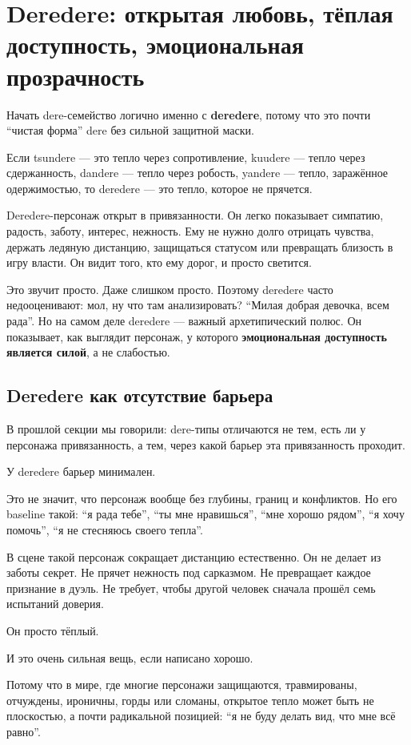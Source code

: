 \section{Deredere: открытая любовь, тёплая доступность, эмоциональная прозрачность}

Начать dere-семейство логично именно с \textbf{deredere}, потому что это
почти ``чистая форма'' dere без сильной защитной маски.

Если tsundere --- это тепло через сопротивление, kuudere --- тепло через
сдержанность, dandere --- тепло через робость, yandere --- тепло,
заражённое одержимостью, то deredere --- это тепло, которое не прячется.

Deredere-персонаж открыт в привязанности. Он легко показывает симпатию,
радость, заботу, интерес, нежность. Ему не нужно долго отрицать чувства,
держать ледяную дистанцию, защищаться статусом или превращать близость в
игру власти. Он видит того, кто ему дорог, и просто светится.

Это звучит просто. Даже слишком просто. Поэтому deredere часто
недооценивают: мол, ну что там анализировать? ``Милая добрая девочка,
всем рада''. Но на самом деле deredere --- важный архетипический полюс.
Он показывает, как выглядит персонаж, у которого \textbf{эмоциональная
доступность является силой}, а не слабостью.

\subsection*{Deredere как отсутствие барьера}

В прошлой секции мы говорили: dere-типы отличаются не тем, есть ли у
персонажа привязанность, а тем, через какой барьер эта привязанность
проходит.

У deredere барьер минимален.

Это не значит, что персонаж вообще без глубины, границ и конфликтов. Но
его baseline такой: ``я рада тебе'', ``ты мне нравишься'', ``мне хорошо
рядом'', ``я хочу помочь'', ``я не стесняюсь своего тепла''.

В сцене такой персонаж сокращает дистанцию естественно. Он не делает из
заботы секрет. Не прячет нежность под сарказмом. Не превращает каждое
признание в дуэль. Не требует, чтобы другой человек сначала прошёл семь
испытаний доверия.

Он просто тёплый.

И это очень сильная вещь, если написано хорошо.

Потому что в мире, где многие персонажи защищаются, травмированы,
отчуждены, ироничны, горды или сломаны, открытое тепло может быть не
плоскостью, а почти радикальной позицией: ``я не буду делать вид, что
мне всё равно''.

